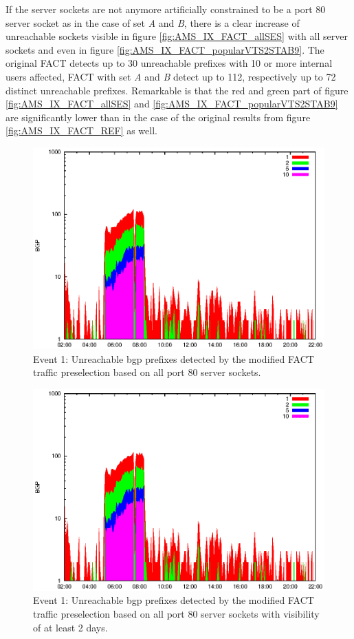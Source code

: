 If the \glspl{server socket} are not anymore artificially constrained to be a port 80 \gls{server socket} as in the case of set \emph{A} and \emph{B}, there is a clear increase of unreachable sockets visible in figure \ref{fig:AMS_IX_FACT_allSES} with all server sockets and even in figure \ref{fig:AMS_IX_FACT_popularVTS2STAB9}. 
The original \gls{FACT} detects up to 30 unreachable prefixes with 10 or more internal users affected, \gls{FACT} with set \emph{A} and \emph{B} detect up to 112, respectively up to 72 distinct unreachable prefixes. 
Remarkable is that the red and green part of figure \ref{fig:AMS_IX_FACT_allSES} and \ref{fig:AMS_IX_FACT_popularVTS2STAB9} are significantly lower than in the case of the original results from figure \ref{fig:AMS_IX_FACT_REF} as well. 
\begin{figure}
	[p] \centering 
	\includegraphics[width=0.75\linewidth]{images/events/2010_03_25/bgp_log_allPort80SES.eps} \caption{Event 1: Unreachable \gls{bgp} prefixes detected by the modified \gls{FACT} traffic preselection based on all port 80 \glspl{server socket}.} 
	\label{fig:AMS_IX_FACT_allSES80} 
\end{figure}
\begin{figure}
	[p] \centering 
	\includegraphics[width=0.75\linewidth]{images/events/2010_03_25/bgp_log_port80_Set_stab_0_vts_2.eps} \caption{Event 1: Unreachable \gls{bgp} prefixes detected by the modified \gls{FACT} traffic preselection based on all port 80 \glspl{server socket} with visibility of at least 2 days.} 
	\label{fig:AMS_IX_FACT_allSES80VTS2} 
\end{figure}
